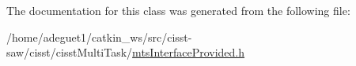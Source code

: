 The documentation for this class was generated from the following file\-:\begin{DoxyCompactItemize}
\item 
/home/adeguet1/catkin\-\_\-ws/src/cisst-\/saw/cisst/cisst\-Multi\-Task/\hyperlink{mts_interface_provided_8h}{mts\-Interface\-Provided.\-h}\end{DoxyCompactItemize}
